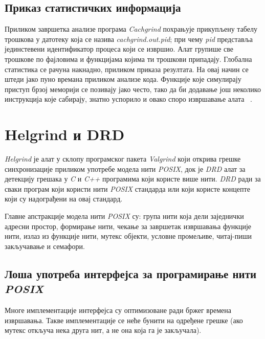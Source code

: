 \documentclass[12pt,oneside]{memoir}
\begin{document}
\subsection{Приказ статистичких информација}

\indent Приликом завршетка анализе програма \textit{Cachgrind} похрањује прикупљену табелу трошкова у датотеку која се назива \textit{cachgrind.out.pid}; при чему \textit{pid} представља јединстевени идентификатор процеса који се извршио. Алат групише све трошкове по фајловима и функцијама којима ти трошкови припадају. Глобална статистика се рачуна накнадно, приликом приказа резултата. На овај начин се штеди јако пуно времана приликом анализе кода. Функције које симулирају приступ брзој меморији се позивају јако често, тако да би додавање још неколико инструкција које сабирају, знатно успорило и овако споро извршавање алата ~\cite{cachegrindRef}.

\section{Helgrind и DRD}
\label{section_helgrind}

\indent \textit{Helgrind} је алат у склопу програмског пакета \textit{Valgrind} који открива грешке синхронизације приликом употребе модела нити \textit{POSIX}, док је \textit{DRD} алат за детекцију грешака у \textit{C} и \textit{C++} програмима који користе више нити. \textit{DRD} ради за сваки програм који користи нити \textit{POSIX} стандарда или који користе концепте који су надограђени на овај стандард.

\indent Главне апстракције модела нити \textit{POSIX} су: група нити која дели заједнички адресни простор, формирање нити, чекање за завршетак извршавања функције нити, излаз из функције нити, мутекс објекти, условне промељиве, читај-пиши закључавање и семафори.

\subsection{Лоша употреба интерфејса за програмирање нити \textit{POSIX}}

\indent Многе имплементације интерфејса су оптимизоване ради бржег времена извршавања. Такве имплементације се неће бунити на одређене грешке (ако мутекс откључа нека друга нит, а не она која га је закључала).
\end{document}

